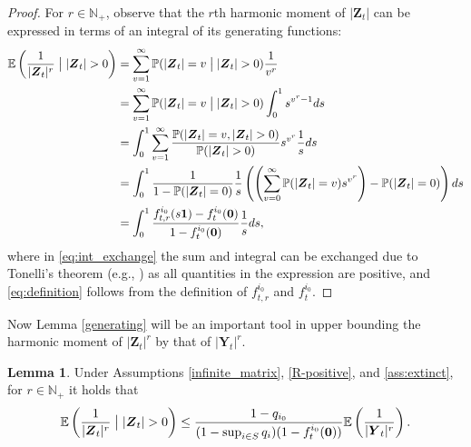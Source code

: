 \documentclass[preprint,3p,12pt]{elsarticle}
\theoremstyle{definition}
\newtheorem{lemma}{Lemma}
\begin{document}
\begin{proof}
For $r \in \mathbb{N}_+$, observe that the $r$th harmonic moment of $|\boldsymbol{Z}_t|$ can be expressed in terms of an integral of its generating functions:
\begin{align}
  \mathbb{E}\left(\frac{1}{|\boldsymbol{Z}_t|^r}\bigm| |\boldsymbol{Z}_{t}| > 0\right)%
  &= \sum_{v =1}^{\infty} \mathbb{P}(|\boldsymbol{Z}_t| = v\bigm| |\boldsymbol{Z}_{t}| > 0) \frac{1}{v^r}\nonumber \\
  &=    \sum_{v =1}^{\infty} \mathbb{P}(|\boldsymbol{Z}_t| = v\bigm| |\boldsymbol{Z}_{t}| > 0) \int_0^1s^{v^r-1}  ds\nonumber \\
  &= \int_0^1   \sum_{v =1}^{\infty}  \frac{\mathbb{P}(|\boldsymbol{Z}_t| = v, |\boldsymbol{Z}_{t}| > 0)}{\mathbb{P}(|\boldsymbol{Z}_{t}| > 0)} s^{v^r} \frac{1}{s}  ds \label{eq:int_exchange}\\
    & =\int_0^1 \frac{1}{1 - \mathbb{P}(|\boldsymbol{Z}_{t}| = 0)} \frac{1}{s}\left( \left(\sum_{v =0}^{\infty} \mathbb{P}(|\boldsymbol{Z}_t| = v) s^{v^r} \right) - \mathbb{P}(|\boldsymbol{Z}_{t}| = 0)\right) ds \nonumber\\
  &= \int_0^1 \frac{f_{t, r}^{i_0}(s\boldsymbol{1})-f_t^{i_0}(\boldsymbol{0})}{1-f_t^{i_0}(\boldsymbol{0})} \frac{1}{s} ds, \label{eq:definition}
\end{align}
where in \eqref{eq:int_exchange} the sum and integral can be exchanged due to Tonelli's theorem (e.g., \cite[Theorem 1.29, p.\ 25]{kallenberg}) %
as all quantities in the expression are positive, and \eqref{eq:definition} follows from the definition of $f_{t,r}^{i_0}$ and $f_t^{i_0}$. 
\end{proof}
Now Lemma \ref{generating} will be an important tool in upper bounding the harmonic moment of $|\boldsymbol{Z}_t|^r$ by that of $|\boldsymbol{Y}_t|^r$.
\begin{lemma} \label{z_and_y_upper}
Under Assumptions \ref{infinite_matrix}, \ref{R-positive}, and \ref{ass:extinct}, for $r \in \mathbb{N}_+$ it holds that
\begin{equation*}
  \mathbb{E}\left(\frac{1}{|\boldsymbol{Z}_t|^r}\bigm| |\boldsymbol{Z}_t| > 0\right) \le \frac{1-q_{i_0}}{    (1-\sup_{i \in S}q_i)(1-f_t^{i_0}(\boldsymbol{0}))  }\mathbb{E}\left(\frac{1}{|\boldsymbol{Y}_t|^r}\right).
   \end{equation*}
\end{lemma}
\end{document}

